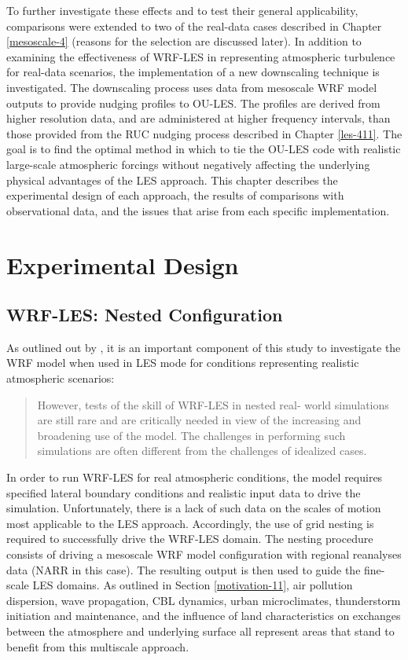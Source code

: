 To further investigate these effects and to test their general applicability, comparisons were extended to two of the real-data cases described in Chapter \autoref{mesoscale-4} (reasons for the selection are discussed later). In addition to examining the effectiveness of WRF-LES in representing atmospheric turbulence for real-data scenarios, the implementation of a new downscaling technique is investigated. The downscaling process uses data from mesoscale WRF model outputs to provide nudging profiles to OU-LES. The profiles are derived from higher resolution data, and are administered at higher frequency intervals, than those provided from the RUC nudging process described in Chapter \autoref{les-411}. The goal is to find the optimal method in which to tie the OU-LES code with realistic large-scale atmospheric forcings without negatively affecting the underlying physical advantages of the LES approach. This chapter describes the experimental design of each approach, the results of comparisons with observational data, and the issues that arise from each specific implementation.

\section{Experimental Design}
\label{ed-61}

\subsection{WRF-LES: Nested Configuration}
\label{nest-611}

As outlined out by  \citet{Talbot2012}, it is an important component of this study to investigate the WRF model when used in LES mode for conditions representing realistic atmospheric scenarios:

\begin{quote}
\OUsinglespace
However, tests of the skill of WRF-LES in nested real- world simulations are still rare and are critically needed in view of the increasing and broadening use of the model. The challenges in performing such simulations are often different from the challenges of idealized cases.
\end{quote}

In order to run WRF-LES for real atmospheric conditions, the model requires specified lateral boundary conditions and realistic input data to drive the simulation. Unfortunately, there is a lack of such data on the scales of motion most applicable to the LES approach. Accordingly, the use of grid nesting is required to successfully drive the WRF-LES domain. The nesting procedure consists of driving a mesoscale WRF model configuration with regional reanalyses data (NARR in this case). The resulting output is then used to guide the fine-scale LES domains. As outlined in Section \autoref{motivation-11}, air pollution dispersion, wave propagation, CBL dynamics, urban microclimates, thunderstorm initiation and maintenance, and the influence of land characteristics on exchanges between the atmosphere and underlying surface all represent areas that stand to benefit from this multiscale approach. 

